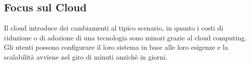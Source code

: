 \documentclass{article}
\begin{document}
		\subsection{Focus sul Cloud}
		Il cloud introduce dei cambiamenti al tipico scenario, in quanto i costi di riduzione o di adozione di una tecnologia sono minori grazie al cloud computing.
		Gli utenti possono configurare il loro sistema in base alle loro esigenze e la scalabilità avviene nel giro di minuti anzichè in giorni.
			
\end{document}
